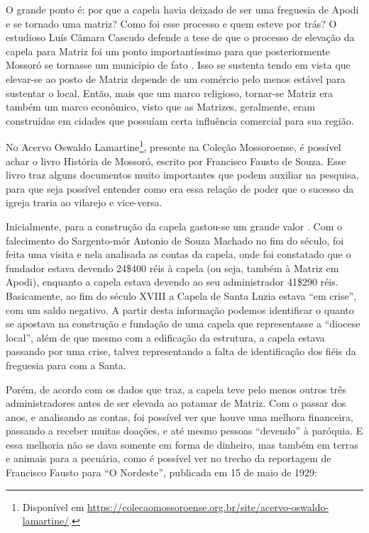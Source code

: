 \begin{refsection}
    O grande ponto é: por que a capela havia deixado de ser uma freguesia de Apodi e se tornado uma matriz? Como foi esse processo e quem esteve por trás? O estudioso Luís Câmara Cascudo defende a tese de que o processo de elevação da capela para Matriz foi um ponto importantíssimo para que posteriormente Mossoró se tornasse um município de fato \cite[p.~54]{Cascudo2010Notas}. Isso se sustenta tendo em vista que elevar-se ao posto de Matriz depende de um comércio pelo menos estável para sustentar o local. Então, mais que um marco religioso, tornar-se Matriz era também um marco econômico, visto que as Matrizes, geralmente, eram construídas em cidades que possuíam certa influência comercial para sua região.

    No Acervo Oswaldo Lamartine\footnote{Disponível em \url{https://colecaomossoroense.org.br/site/acervo-oswaldo-lamartine/}.}, presente na Coleção Mossoroense, é possível achar o livro História de Mossoró, escrito por Francisco Fausto de Souza. Esse livro traz alguns documentos muito importantes que podem auxiliar na pesquisa, para que seja possível entender como era essa relação de poder que o sucesso da igreja traria ao vilarejo e vice-versa. 

    Inicialmente, para a construção da capela gastou-se um grande valor \cite[exatos 590\$770 rs, como consta no livro de ][p.~54]{Souza2010Historia}. Com o falecimento do Sargento-mór Antonio de Souza Machado no fim do século, foi feita uma visita e nela analisada as contas da capela, onde foi constatado que o fundador estava devendo 24\$400 réis à capela (ou seja, também à Matriz em Apodi), enquanto a capela estava devendo ao seu administrador 41\$290 réis. Basicamente, ao fim do século XVIII a Capela de Santa Luzia estava ``em crise'', com um saldo negativo. A partir desta informação podemos identificar o quanto se apostava na construção e fundação de uma capela que representasse a ``diocese local'', além de que mesmo com a edificação da estrutura, a capela estava passando por uma crise, talvez representando a falta de identificação dos fiéis da freguesia para com a Santa.

    Porém, de acordo com os dados que \textcite[p.~58]{Souza2010Historia} traz, a capela teve pelo menos outros três administradores antes de ser elevada ao patamar de Matriz. Com o passar dos anos, e analisando as contas, foi possível ver que houve uma melhora financeira, passando a receber muitas doações, e até mesmo pessoas ``devendo'' à paróquia. E essa melhoria não se dava somente em forma de dinheiro, mas também em terras e animais para a pecuária, como é possível ver no trecho da reportagem de Francisco Fausto para ``O Nordeste'', publicada em 15 de maio de 1929:


\end{refsection}
